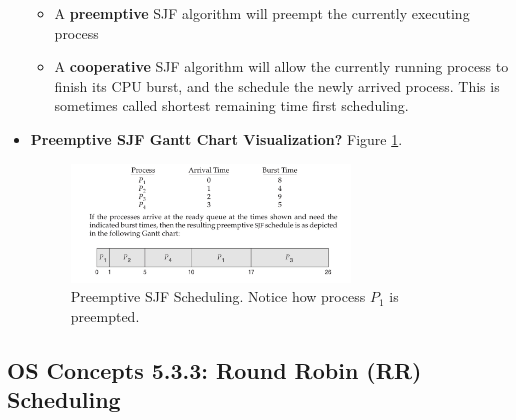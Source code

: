 \documentclass[12pt]{article}
\begin{document}
\begin{itemize}
        \begin{itemize}
            \item A \textbf{preemptive} SJF algorithm will preempt the currently executing process
            \item A \textbf{cooperative} SJF algorithm will allow the currently running process to finish its CPU burst, and the schedule the newly arrived process. This is sometimes called shortest remaining time first scheduling.
        \end{itemize}
    \item \textbf{Preemptive SJF Gantt Chart Visualization?} Figure \ref{fig:sjf-preemptive-scheduling}.
        \begin{figure}[ht]
            \centering
            \includegraphics[width=0.7\textwidth]{figures/sjf-preemptive-scheduling.jpg}
            \caption{Preemptive SJF Scheduling. Notice how process \(P_1\) is preempted.}
            \label{fig:sjf-preemptive-scheduling}
        \end{figure}
\end{itemize}

\subsection*{OS Concepts 5.3.3: Round Robin (RR) Scheduling}
\end{document}
